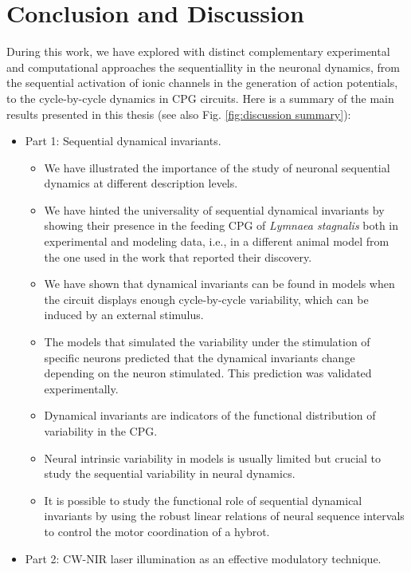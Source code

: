 \chapter{Conclusion and Discussion} %
\label{c-conclusion}

During this work, we have explored with distinct complementary experimental and computational  approaches the sequentiallity in the neuronal dynamics, from the sequential activation of ionic channels in the generation of action potentials, to the cycle-by-cycle dynamics in CPG circuits. Here is a summary of the main results presented in this thesis (see also Fig. \ref{fig:discussion summary}):

\begin{itemize}
	\item Part 1: Sequential dynamical invariants.
 \begin{itemize}
     \item We have illustrated the importance of the study of neuronal sequential dynamics at different description levels.
     \item We have hinted the universality of sequential dynamical invariants by showing their  presence in the feeding CPG of  \textit{Lymnaea stagnalis} both in experimental and modeling data, i.e., in a different animal model from the one used in the work that reported their discovery.
     \item We have shown that dynamical invariants can be found in models when the circuit displays enough cycle-by-cycle variability, which can be induced by an external stimulus.
     \item The models that simulated the variability under the stimulation of specific neurons predicted that the dynamical invariants change depending on the neuron stimulated. This prediction was validated experimentally.
     \item Dynamical invariants are indicators of the functional distribution of  variability  in the CPG.
     \item Neural intrinsic variability in models is usually limited but crucial to study the sequential variability in neural dynamics.
     \item It is possible to study the functional role of sequential dynamical invariants by using  the robust linear relations of neural sequence intervals to control the motor coordination of a hybrot.
 \end{itemize}
	\item Part 2: CW-NIR laser illumination as an effective modulatory technique.

\end{itemize}
